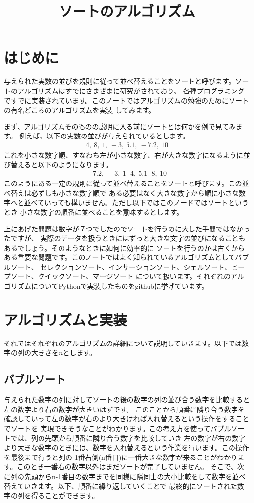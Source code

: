 \documentclass[dvipdfmx,pic,eepic,ecltree]{jarticle}
\title{ソートのアルゴリズム}
\author{}
\date{}
\begin{document}
\maketitle
\section{はじめに}
与えられた実数の並びを規則に従って並べ替えることをソートと呼びます。ソートのアルゴリズムはすでにさまざまに研究がされており、
各種プログラミングですでに実装されています。このノートではアルゴリズムの勉強のためにソートの有名どころのアルゴリズムを実装
してみます。

まず、アルゴリズムそのものの説明に入る前にソートとは何かを例で見てみます。
例えば、以下の実数の並びが与えられているとします。
\begin{eqnarray}
4,~8,~1,~-3,~5.1,~-7.2,~10
\end{eqnarray}
これを小さな数字順、すなわち左が小さな数字、右が大きな数字になるように並び替えると以下のようになります。
\begin{eqnarray}
-7.2,~-3,~1,~4,~5.1,~8,~10
\end{eqnarray}
このようにある一定の規則に従って並べ替えることをソートと呼びます。この並べ替えは必ずしも小さな数字順で
ある必要はなく大きな数字から順に小さな数字へと並べていっても構いません。ただし以下ではこのノードではソートというとき
小さな数字の順番に並べることを意味するとします。

上にあげた問題は数字が７つでしたのでソートを行うのに大した手間ではなかったですが、
実際のデータを扱うときにはずっと大きな文字の並びになることもあるでしょう。そのようなときに如何に効率的に
ソートを行うのかは古くからある重要な問題です。このノートではよく知られているアルゴリズムとしてバブルソート、
セレクションソート、インサーションソート、シェルソート、ヒープソート、クイックソート、マージソート
について扱います。それぞれのアルゴリズムについてPythonで実装したものをgithubに挙げています。

\section{アルゴリズムと実装}
それではそれぞれのアルゴリズムの詳細について説明していきます。以下では数字の列の大きさを$n$とします。
\subsection{バブルソート}
与えられた数字の列に対してソートの後の数字の列の並び合う数字を比較すると左の数字より右の数字が大きいはずです。
このことから順番に隣り合う数字を確認していって左の数字が右のより大きければ入れ替えるという操作をすることでソートを
実現できそうなことがわかります。この考え方を使ってバブルソートでは、列の先頭から順番に隣り合う数字を比較していき
左の数字が右の数字より大きな数字のときには、数字を入れ替えるという作業を行います。この操作を最後まで行うと列の
1番右側(n番目)に一番大きな数字が来ることがわかります。このとき一番右の数字以外はまだソートが完了していません。
そこで、次に列の先頭からn-1番目の数字までを同様に隣同士の大小比較をして数字を並べ替えていきます。以下、順番に繰り返していくことで
最終的にソートされた数字の列を得ることができます。
\end{document}

